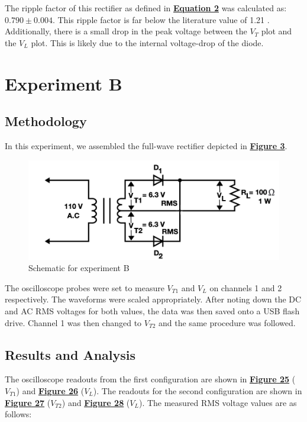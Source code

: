 \documentclass[
	letterpaper
	12pt
]{template}
\newcommand{\bref}[2]{\textbf{\hyperref[#1]{#2}}}
\begin{document}
The ripple factor of this rectifier as defined in \bref{eqn::ripple}{Equation 2} was calculated as: $0.790\pm0.004$. This ripple factor is far below the literature value of 1.21 \cite{Rashid_2006}. Additionally, there is a small drop in the peak voltage between the $V_T$ plot and the $V_L$ plot. This is likely due to the internal voltage-drop of the diode.










\section{Experiment B}\label{exp::B}
\subsection{Methodology}\label{method::B}
In this experiment, we assembled the full-wave rectifier depicted in \textbf{\hyperref[apparatus::B]{Figure 3}}.
\begin{figure}[H]\label{apparatus::B}
	\centering
	\begin{minipage}[c]{0.45\textwidth}
		\centering
		\includegraphics[width=\textwidth]{figures/B/schematic.png}
		\caption{Schematic for experiment B \\ \protect\cite{labManual}}
	\end{minipage}
\end{figure}

The oscilloscope probes were set to measure $V_{T1}$ and $V_L$ on channels 1 and 2 respectively. The waveforms were scaled appropriately. After noting down the DC and AC RMS voltages for both values, the data was then saved onto a USB flash drive. Channel 1 was then changed to $V_{T2}$ and the same procedure was followed.

\subsection{Results and Analysis}
The oscilloscope readouts from the first configuration are shown in \bref{data::B}{Figure 25} ($V_{T1}$) and \bref{data::B}{Figure 26} ($V_L$). The readouts for the second configuration are shown in \bref{data::B2}{Figure 27} ($V_{T2}$) and \bref{data::B2}{Figure 28} ($V_L$). The measured RMS voltage values are as follows:
\end{document}
